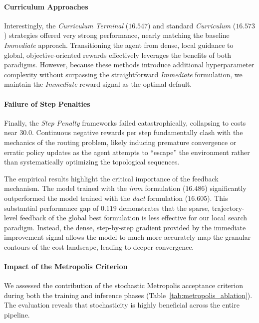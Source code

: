 \documentclass[letterpaper]{article} %
\begin{document}
\paragraph{Curriculum Approaches}
Interestingly, the \textit{Curriculum Terminal} ($16.547$) and standard \textit{Curriculum} ($16.573$) strategies offered very strong performance, nearly matching the baseline \textit{Immediate} approach. Transitioning the agent from dense, local guidance to global, objective-oriented rewards effectively leverages the benefits of both paradigms. However, because these methods introduce additional hyperparameter complexity without surpassing the straightforward \textit{Immediate} formulation, we maintain the \textit{Immediate} reward signal as the optimal default.

\paragraph{Failure of Step Penalties}
Finally, the \textit{Step Penalty} frameworks failed catastrophically, collapsing to costs near $30.0$. Continuous negative rewards per step fundamentally clash with the mechanics of the routing problem, likely inducing premature convergence or erratic policy updates as the agent attempts to ``escape'' the environment rather than systematically optimizing the topological sequences.

The empirical results highlight the critical importance of the feedback mechanism. The model trained with the \textit{imm} formulation ($16.486$) significantly outperformed the model trained with the \textit{dact} formulation ($16.605$). This substantial performance gap of $0.119$ demonstrates that the sparse, trajectory-level feedback of the global best formulation is less effective for our local search paradigm. Instead, the dense, step-by-step gradient provided by the immediate improvement signal allows the model to much more accurately map the granular contours of the cost landscape, leading to deeper convergence.

\paragraph{Impact of the Metropolis Criterion}
We assessed the contribution of the stochastic Metropolis acceptance criterion during both the training and inference phases (Table~\ref{tab:metropolis_ablation}). The evaluation reveals that stochasticity is highly beneficial across the entire pipeline. 
\end{document}
